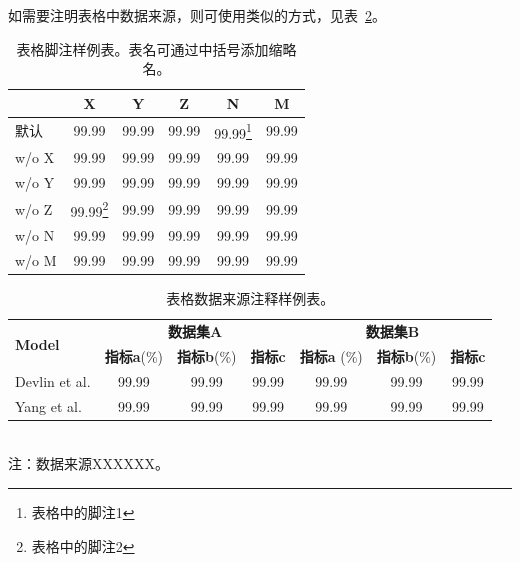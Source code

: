 如需要注明表格中数据来源，则可使用类似的方式，见表~\ref{tab:example-table-source-foot}。

\begin{table}[htb]
    \centering
    \begin{minipage}[t]{0.55\linewidth} %
        \caption[表格脚注样例表]{表格脚注样例表。表名可通过中括号添加缩略名。}
        \label{tab:example-table-basic}
        \begin{small}
        \begin{tabular}{@{}lccccc@{}}
         \toprule[1.5pt]
         & \textbf{X} & \textbf{Y} & \textbf{Z} & \textbf{N} & \textbf{M} \\
         \midrule[1pt]
            默认        & 99.99 & 99.99 & 99.99 & 99.99\footnote{表格中的脚注1} & 99.99 \\
          \quad w/o X   & 99.99 & 99.99 & 99.99 & 99.99 & 99.99 \\
          \quad w/o Y   & 99.99 & 99.99 & 99.99 & 99.99 & 99.99 \\
          \quad w/o Z   & 99.99\footnote{表格中的脚注2} & 99.99 & 99.99 & 99.99 & 99.99 \\
          \quad w/o N   & 99.99 & 99.99 & 99.99 & 99.99 & 99.99 \\
          \quad w/o M   & 99.99 & 99.99 & 99.99 & 99.99 & 99.99 \\
          \bottomrule[1.5pt]
        \end{tabular}
        \end{small}
    \end{minipage}
\end{table}

\begin{table}[htbp]
   \centering
   \caption[数据来源注释表]{表格数据来源注释样例表。}
   \label{tab:example-table-source-foot}
   \begin{minipage}[t]{0.9\textwidth}
   \begin{small}
   \begin{tabular}{@{}l|ccc|ccc@{}}
   \toprule
   \multirow{2}{*}{\textbf{Model}} & \multicolumn{3}{c|}{\textbf{数据集A}} & \multicolumn{3}{c}{\textbf{数据集B}} \\ \cmidrule(l){2-7} 
    & \textbf{指标a}(\%) & \textbf{指标b}(\%) & \textbf{指标c} & \textbf{指标a} (\%) & \textbf{指标b}(\%) & \textbf{指标c} \\ \midrule
    Devlin et al.\cite{devlin2018bert}      &99.99  & 99.99  & 99.99  &99.99  & 99.99  & 99.99  \\
    Yang et al.\cite{yang2019xlnet}      &99.99  & 99.99  & 99.99  &99.99  & 99.99  & 99.99  \\
    \bottomrule
   \end{tabular}\\[6pt]
   \footnotesize 注：数据来源XXXXXX。\\
   \end{small}
   \end{minipage}
\end{table}

